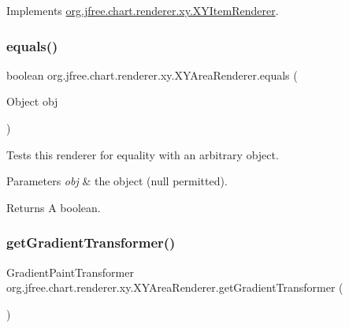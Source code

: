 Implements \mbox{\hyperlink{interfaceorg_1_1jfree_1_1chart_1_1renderer_1_1xy_1_1_x_y_item_renderer_ad867040a3ea09f5127596aacdd94586a}{org.\+jfree.\+chart.\+renderer.\+xy.\+X\+Y\+Item\+Renderer}}.

\mbox{\label{classorg_1_1jfree_1_1chart_1_1renderer_1_1xy_1_1_x_y_area_renderer_ae99ec95f254c39b78c6bb85b4991aa71}} 
\subsubsection{\texorpdfstring{equals()}{equals()}}
{\footnotesize\ttfamily boolean org.\+jfree.\+chart.\+renderer.\+xy.\+X\+Y\+Area\+Renderer.\+equals (\begin{DoxyParamCaption}\item[{Object}]{obj }\end{DoxyParamCaption})}

Tests this renderer for equality with an arbitrary object.


\begin{DoxyParams}{Parameters}
{\em obj} & the object ({\ttfamily null} permitted).\\
\hline
\end{DoxyParams}
\begin{DoxyReturn}{Returns}
A boolean. 
\end{DoxyReturn}
\mbox{\label{classorg_1_1jfree_1_1chart_1_1renderer_1_1xy_1_1_x_y_area_renderer_a443e628932403853bc0ead2bf5669546}} 
\subsubsection{\texorpdfstring{get\+Gradient\+Transformer()}{getGradientTransformer()}}
{\footnotesize\ttfamily Gradient\+Paint\+Transformer org.\+jfree.\+chart.\+renderer.\+xy.\+X\+Y\+Area\+Renderer.\+get\+Gradient\+Transformer (\begin{DoxyParamCaption}{ }\end{DoxyParamCaption})}

